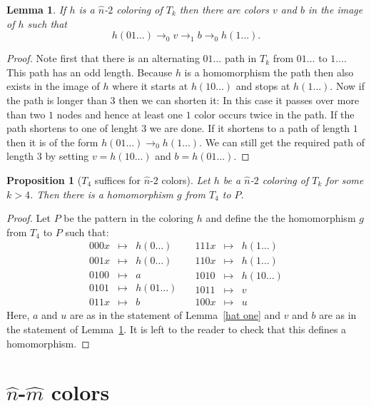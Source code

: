 \documentclass[a4paper]{article}
\newtheorem{lemma}[theorem]{Lemma}
\newtheorem{proposition}[theorem]{Proposition}
\begin{document}
\begin{lemma} \label{hat two}
 If $h$ is a $\hat{n}$-$2$ coloring of $T_k$ then there are colors $v$
and $b$ in the image of $h$ such that
\[
 h(01\dots) \rightarrow_0 v \rightarrow_1 b \rightarrow_0 h(1\dots).
\]
\end{lemma}
\begin{proof}
 Note first that there is an alternating $01 \dots$ path in $T_k$ from
$01\dots$ to $1 \dots$. This path has an odd length. Because $h$ is a
homomorphism the path then also exists in the image of $h$ where it
starts at $h(10\dots)$ and stops at $h(1\dots)$. Now if the path is
longer than $3$ then we can shorten it: In this case it passes over more
than two $1$ nodes and hence at least one $1$ color occurs twice in the
path. If the path shortens to one of lenght $3$ we are done. If it
shortens to a path of length $1$ then it is of the form $h(01\dots)
\rightarrow_0 h(1\dots)$. We can still get the required path of length
$3$ by setting $v = h(10\dots)$ and $b = h(01\dots)$.
\end{proof}

\begin{proposition}[$T_4$ suffices for $\hat{n}$-$2$ colors]
 Let $h$ be a $\hat{n}$-$2$ coloring of $T_k$ for some $k > 4$. Then
there is a homomorphism $g$ from $T_4$ to $P$.
\end{proposition}
\begin{proof}
Let $P$ be the pattern in the coloring $h$ and define the the
homomorphism $g$ from $T_4$ to $P$ such that:
\[
 \begin{array}{rcl}
 000x & \mapsto & h(0\dots) \\
 001x & \mapsto & h(0\dots) \\
 0100 & \mapsto & a \\
 0101 & \mapsto & h(01\dots) \\
 011x & \mapsto & b
 \end{array} \quad
 \begin{array}{rcl}
 111x & \mapsto & h(1\dots) \\
 110x & \mapsto & h(1\dots) \\
 1010 & \mapsto & h(10\dots) \\
 1011 & \mapsto & v \\
 100x & \mapsto & u
 \end{array}
\]
Here, $a$ and $u$ are as in the statement of Lemma~\ref{hat one} and $v$
and $b$ are as in the statement of Lemma~\ref{hat two}. It is left to
the reader to check that this defines a homomorphism.
\end{proof}

\section*{$\hat{n}$-$\hat{m}$ colors}
\end{document}
